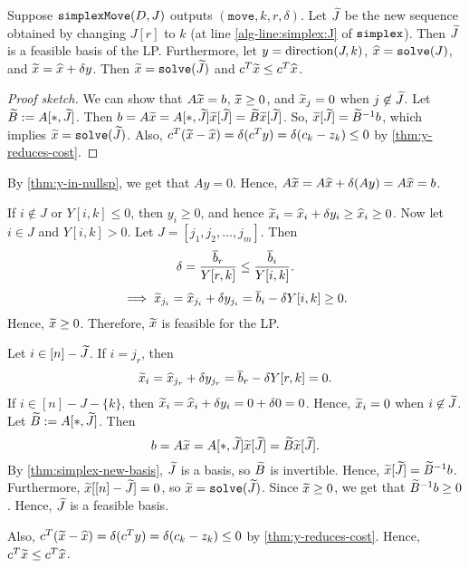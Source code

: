 \begin{lemma}
\label{thm:simplex-feasible-basis}
Suppose $\operatorname{\mathtt{simplexMove}}(D, J)$ outputs $(\mathtt{move}, k, r, \delta)$.
Let $\widetilde{J}$ be the new sequence obtained by changing $J[r]$ to $k$
(at line \ref{alg-line:simplex:J} of $\operatorname{\mathtt{simplex}}$).
Then $\widetilde{J}$ is a feasible basis of the LP.
Furthermore, let $y = \operatorname{direction}(J, k)$, $\widehat{x} = \operatorname{\mathtt{solve}}(J)$, and $\widetilde{x} = \widehat{x} + \delta y$.
Then $\widetilde{x} = \operatorname{\mathtt{solve}}(\widetilde{J})$ and $c^T\widetilde{x} \le c^T\widehat{x}$.
\end{lemma}
\begin{proof}[Proof sketch]
We can show that $A\widetilde{x} = b$, $\widetilde{x} \ge 0$, and $\widetilde{x}_j = 0$ when $j \not\in \widetilde{J}$.
Let $\widetilde{B} := A[*,\widetilde{J}]$. Then
$b = A\widetilde{x} = A[*,\widetilde{J}]\widetilde{x}[\widetilde{J}] = \widetilde{B}\widetilde{x}[\widetilde{J}]$.
So, $\widetilde{x}[\widetilde{J}] = \widetilde{B}^{-1}b$, which implies $\widetilde{x} = \operatorname{\mathtt{solve}}(\widetilde{J})$.
Also, $c^T(\widetilde{x} - \widehat{x}) = \delta(c^Ty) = \delta(c_k - z_k) \le 0$ by \cref{thm:y-reduces-cost}.
\end{proof}
\begin{longProof}
By \cref{thm:y-in-nullsp}, we get that $Ay = 0$.
Hence, $A\widetilde{x} = A\widehat{x} + \delta (Ay) = A\widehat{x} = b$.

If $i \not\in J$ or $Y[i, k] \le 0$, then $y_i \ge 0$,
and hence $\widetilde{x}_i = \widehat{x}_i + \delta y_i \ge \widehat{x}_i \ge 0$.
Now let $i \in J$ and $Y[i,k] > 0$.
Let $J = [j_1, j_2, \ldots, j_m]$. Then
\[ \delta = \frac{\overline{b}_r}{Y[r,k]} \le \frac{\overline{b}_i}{Y[i, k]}. \]
\[ \implies \widetilde{x}_{j_i} = \widehat{x}_{j_i} + \delta y_{j_i} = \overline{b}_i - \delta Y[i,k] \ge 0. \]
Hence, $\widetilde{x} \ge 0$. Therefore, $\widetilde{x}$ is feasible for the LP.

Let $i \in [n] - \widetilde{J}$. If $i = j_r$, then
\[ \widetilde{x}_i = \widehat{x}_{j_r} + \delta y_{j_r} = \overline{b}_r - \delta Y[r,k] = 0. \]
If $i \in [n] - J - \{k\}$, then $\widetilde{x}_i = \widehat{x}_i + \delta y_i = 0 + \delta 0 = 0$.
Hence, $\widetilde{x}_i = 0$ when $i \not\in \widetilde{J}$.
Let $\widetilde{B} := A[*,\widetilde{J}]$. Then
\[ b = A\widetilde{x} = A[*,\widetilde{J}]\widetilde{x}[\widetilde{J}] = \widetilde{B}\widetilde{x}[\widetilde{J}]. \]
By \cref{thm:simplex-new-basis}, $\widetilde{J}$ is a basis, so $\widetilde{B}$ is invertible.
Hence, $\widetilde{x}[\widetilde{J}] = \widetilde{B}^{-1}b$.
Furthermore, $\widetilde{x}[[n] - \widetilde{J}] = 0$, so $\widetilde{x} = \operatorname{\mathtt{solve}}(\widetilde{J})$.
Since $\widetilde{x} \ge 0$, we get that $\widetilde{B}^{-1}b \ge 0$.
Hence, $\widetilde{J}$ is a feasible basis.

Also, $c^T(\widetilde{x} - \widehat{x}) = \delta(c^Ty) = \delta(c_k - z_k) \le 0$ by \cref{thm:y-reduces-cost}.
Hence, $c^T\widetilde{x} \le c^T\widehat{x}$.
\end{longProof}

